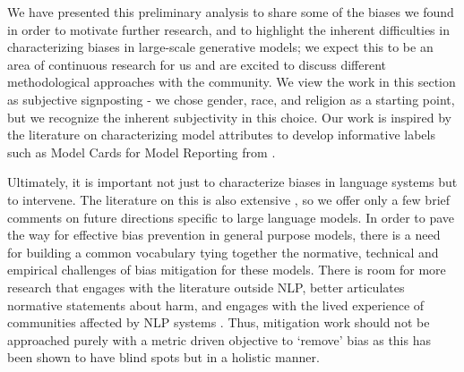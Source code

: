 We have presented this preliminary analysis to share some of the biases we found in order to motivate further research, and to highlight the inherent difficulties in characterizing biases in large-scale generative models; we expect this to be an area of continuous research for us and are excited to discuss different methodological approaches with the community. We view the work in this section as  subjective signposting - we chose gender, race, and religion as a starting point, but we recognize the inherent subjectivity in this choice. Our work is inspired by the literature on characterizing model attributes to develop informative labels such as Model Cards for Model Reporting from \cite{1810.03993}.

Ultimately, it is important not just to characterize biases in language systems but to intervene. The literature on this is also extensive \cite{qian2019reducing,huang2019reducing}, so we offer only a few brief comments on future directions specific to large language models. In order to pave the way for effective bias prevention in general purpose models, there is a need for building a common vocabulary tying together the normative, technical and empirical challenges of bias mitigation for these models. There is room for more research that engages with the literature outside NLP, better articulates normative statements about harm, and engages with the lived experience of communities affected by NLP systems  \cite{blodgett2020language}. Thus, mitigation work should not be approached purely with a metric driven objective to `remove' bias as this has been shown to have blind spots \cite{gonen2019lipstick, nissim2019fair} but in a holistic manner.
